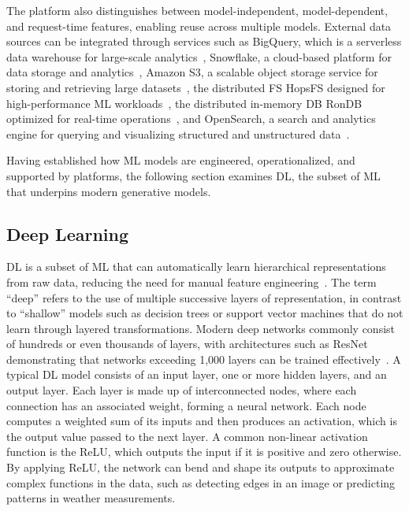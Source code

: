 \documentclass[
english,                 %
bibtex,                  %
includeExtraAbstracts, %
]{kththesis}
\numberwithin{listing}{chapter}
\begin{document}
The platform also distinguishes between model-independent, model-dependent, and request-time features, enabling reuse across multiple models. External data sources can be integrated through services such as BigQuery, which is a serverless data warehouse for large-scale analytics~\cite{fernandes_what_2015}, Snowflake, a cloud-based platform for data storage and analytics~\cite{snowflake_inc_snowflake_2026}, \Gls{Amazon S3}, a scalable object storage service for storing and retrieving large datasets~\cite{armbrust_view_2010}, the distributed \gls{FS} Hops\gls{FS} designed for high-performance \gls{ML} workloads~\cite{niazi_hopsfs_2017}, the distributed in-memory \gls{DB} Ron\gls{DB} optimized for real-time operations~\cite{hopsworks_ab_rondb_2026}, and OpenSearch, a search and analytics engine for querying and visualizing structured and unstructured data~\cite{lf_projects_llc_opensearch_2026}.

Having established how \gls{ML} models are engineered, operationalized, and supported by platforms, the following section examines \gls{DL}, the subset of \gls{ML} that underpins modern generative models.

\subsection{Deep Learning}

\Gls{DL} is a subset of \gls{ML} that can automatically learn hierarchical representations from raw data, reducing the need for manual feature engineering~\cite{lecun_deep_2015}. The term ``deep'' refers to the use of multiple successive layers of representation, in contrast to ``shallow'' models such as decision trees or support vector machines that do not learn through layered transformations. Modern deep networks commonly consist of hundreds or even thousands of layers, with architectures such as ResNet demonstrating that networks exceeding 1,000 layers can be trained effectively~\cite{he_deep_2016}. A typical \gls{DL} model consists of an input layer, one or more hidden layers, and an output layer. Each layer is made up of interconnected nodes, where each connection has an associated weight, forming a neural network. Each node computes a weighted sum of its inputs and then produces an activation, which is the output value passed to the next layer. A common non-linear activation function is the \gls{ReLU}, which outputs the input if it is positive and zero otherwise. By applying \gls{ReLU}, the network can bend and shape its outputs to approximate complex functions in the data, such as detecting edges in an image or predicting patterns in weather measurements.
\end{document}
